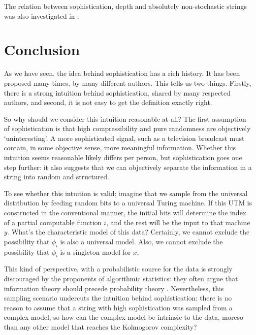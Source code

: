 \documentclass{style/llncs}
\begin{document}
The relation between sophistication, depth and absolutely non-stochastic strings was also investigated in \cite{antunes2013sophistication}.

\section{Conclusion}
\label{section:conclusion}
As we have seen, the idea behind sophistication has a rich history. It has been proposed many times, by many different authors. This tells us two things. Firstly, there is a strong intuition behind sophistication, shared by many respected authors, and second, it is not easy to get the definition exactly right.

So why should we consider this intuition reasonable at all? The first assumption of sophistication is that high compressibility and pure randomness are objectively `uninteresting'. A more sophisticated signal, such as a television broadcast must contain, in some objective sense, more meaningful information. Whether this intuition seems reasonable likely differs per person, but sophistication goes one step further: it also suggests that we can objectively separate the information in a string into random and structured.

To see whether this intuition is valid; imagine that we sample from the universal distribution by feeding random bits to a universal Turing machine. If this UTM is constructed in the conventional manner, the initial bits will determine the index of a partial computable function $i$, and the rest will be the input to that machine $y$. What's the characteristic model of this data? Certainly, we cannot exclude the possibility that $\phi_i$ is also a universal model. Also, we cannot exclude the possibility that $\phi_i$ is a singleton model for $x$.

This kind of perspective, with a probabilistic source for the data is strongly discouraged by the proponents of algorithmic statistics: they often argue that information theory should precede probability theory \cite{kolmogorov1983combinatorial}. Nevertheless, this sampling scenario undercuts the intuition behind sophistication: there is no reason to assume that a string with high sophistication was sampled from a complex model, so how can the complex model be intrinsic to the data, moreso than any other model that reaches the Kolmogorov complexity?\footnotemark

\end{document}
